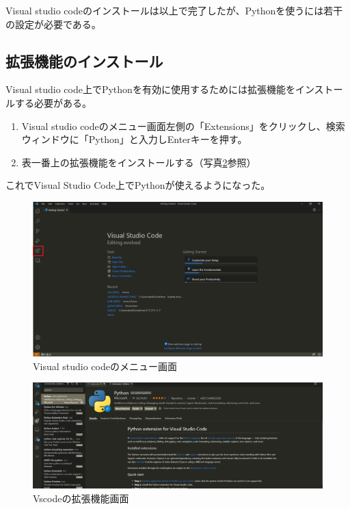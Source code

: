 \documentclass[]{ltjsbook}
\begin{document}
	Visual studio codeのインストールは以上で完了したが、Pythonを使うには若干の設定が必要である。

	\subsection{拡張機能のインストール}
	Visual studio code上でPythonを有効に使用するためには拡張機能をインストールする必要がある。
	\begin{enumerate}
		\item Visual studio codeのメニュー画面左側の「Extensions」をクリックし、検索ウィンドウに「Python」と入力しEnterキーを押す。
		\item 表一番上の拡張機能をインストールする（写真\ref{fig:vscode-extension}参照）
	\end{enumerate}
	これでVisual Studio Code上でPythonが使えるようになった。


	\begin{figure}
		\centering
		\includegraphics[width=0.9\linewidth]{figs/vscode1.png}
		\caption{Visual studio codeのメニュー画面}
		\label{fig:1}
	\end{figure}

	\begin{figure}
		\centering
		\includegraphics[width=0.9\linewidth]{figs/vscode2.png}
		\caption{Vscodeの拡張機能画面}
		\label{fig:vscode-extension}
	\end{figure}
\end{document}
